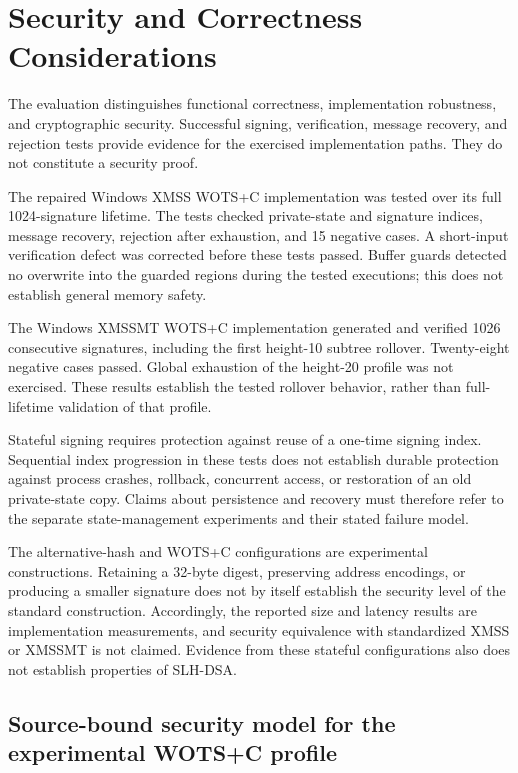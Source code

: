 \section{Security and Correctness Considerations}
\label{sec:security}

The evaluation distinguishes functional correctness, implementation
robustness, and cryptographic security. Successful signing, verification,
message recovery, and rejection tests provide evidence for the exercised
implementation paths. They do not constitute a security proof.

The repaired Windows XMSS WOTS+C implementation was tested over its full
1024-signature lifetime. The tests checked private-state and signature indices,
message recovery, rejection after exhaustion, and 15 negative cases. A
short-input verification defect was corrected before these tests passed.
Buffer guards detected no overwrite into the guarded regions during the
tested executions; this does not establish general memory safety.

The Windows XMSSMT WOTS+C implementation generated and verified 1026
consecutive signatures, including the first height-10 subtree rollover.
Twenty-eight negative cases passed. Global exhaustion of the height-20
profile was not exercised. These results establish the tested rollover
behavior, rather than full-lifetime validation of that profile.

Stateful signing requires protection against reuse of a one-time signing
index. Sequential index progression in these tests does not establish
durable protection against process crashes, rollback, concurrent access,
or restoration of an old private-state copy. Claims about persistence and
recovery must therefore refer to the separate state-management experiments
and their stated failure model.

The alternative-hash and WOTS+C configurations are experimental
constructions. Retaining a 32-byte digest, preserving address encodings,
or producing a smaller signature does not by itself establish the security
level of the standard construction. Accordingly, the reported size and
latency results are implementation measurements, and security equivalence
with standardized XMSS or XMSSMT is not claimed. Evidence from these
stateful configurations also does not establish properties of SLH-DSA.


\subsection{Source-bound security model for the experimental WOTS+C profile}
\label{subsec:wotsc_security_model}

